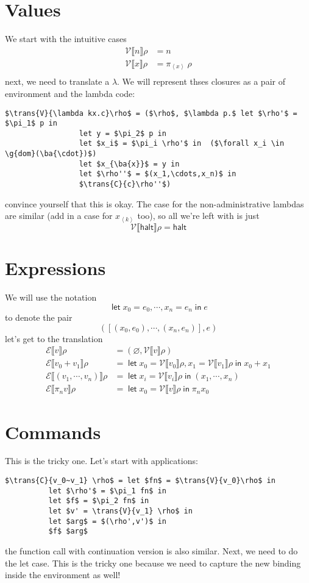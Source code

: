 \documentclass[11pt,a4paper]{article}
\newcommand {\coo} [1] {\ensuremath{\operatorname{\mathsf{#1}}}}
\newcommand{\Let}[1]{\coo{let} #1 \coo{in} }
\newcommand{\ba}[1]{\left\langle #1\right\rangle}
\newcommand{\g}[1]{\textsf{#1}}
\newcommand{\trans}[2]{\ensuremath{\mathcal{#1}\llbracket #2\rrbracket}}
\begin{document}
\section{Values}
We start with the intuitive cases
\begin{align*}
\trans{V}{n}\rho &= n \\
\trans{V}{x} \rho &= \pi_{\ba{x}}~\rho \\
\end{align*}
next, we need to translate a $\lambda$. We will represent thses closures as a pair of environment and the lambda code:
\begin{lstlisting}
$\trans{V}{\lambda kx.c}\rho$ = ($\rho$, $\lambda p.$ let $\rho'$ = $\pi_1$ p in
                 let y = $\pi_2$ p in
                 let $x_i$ = $\pi_i \rho'$ in  ($\forall x_i \in \g{dom}(\ba{\cdot})$)
                 let $x_{\ba{x}}$ = y in
                 let $\rho''$ = $(x_1,\cdots,x_n)$ in
                 $\trans{C}{c}\rho''$)
\end{lstlisting}
convince yourself that this is okay. The case for the non-administrative lambdas are similar (add in a case for $x_{\ba{k}}$ too), so all we're left with is just
$$
\trans{V}{\g{halt}} \rho = \g{halt}
$$

\section{Expressions}
We will use the notation
$$
\Let{x_0 = e_0,\cdots,x_n = e_n}{e}
$$
to denote the pair
$$
([(x_0,e_0), \cdots, (x_n,e_n)], e)
$$
let's get to the translation
\begin{align*}
\trans{E}{v}\rho &= (\varnothing, \trans{V}{v}\rho) \\
\trans{E}{v_0 + v_1} \rho &= \Let{x_0 = \trans{V}{v_0}\rho, x_1 = \trans{V}{v_1}\rho}{x_0 + x_1} \\
\trans{E}{(v_1,\cdots,v_n)} \rho &= \Let{x_i = \trans{V}{v_i}\rho}{(x_1,\cdots, x_n)} \\
\trans{E}{\pi_n v}\rho &= \Let{x_0 = \trans{V}{v}\rho}{\pi_n x_0}
\end{align*}

\section{Commands}
This is the tricky one. Let's start with applications:
\begin{lstlisting}
$\trans{C}{v_0~v_1} \rho$ = let $fn$ = $\trans{V}{v_0}\rho$ in
          let $\rho'$ = $\pi_1 fn$ in
          let $f$ = $\pi_2 fn$ in
          let $v' = \trans{V}{v_1} \rho$ in
          let $arg$ = $(\rho',v')$ in
          $f$ $arg$
\end{lstlisting}
the function call with continuation version is also similar. Next, we need to do the \g{let} case. This is the tricky one because we need to capture the new binding inside the environment as well!
\end{document}
